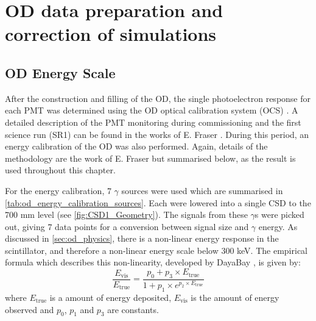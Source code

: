 \section{OD data preparation and correction of simulations}

\subsection{OD Energy Scale} \label{sec:od_energy_scale}
\par
After the construction and filling of the OD, the single photoelectron response for each PMT was determined using the OD optical calibration system (OCS) \cite{lz_ocs_system_ref}.
A detailed description of the PMT monitoring during commissioning and the first science run (SR1) can be found in the works of E. Fraser \cite{ewanfraser_thesis_ref}. 
During this period, an energy calibration of the OD was also performed.
Again, details of the methodology are the work of E. Fraser \cite{ewanfraser_thesis_ref} but summarised below, as the result is used throughout this chapter.
\par
For the energy calibration, 7 $\gamma$ sources were used which are summarised in \autoref{tab:od_energy_calibration_sources}.
Each were lowered into a single CSD to the 700 mm level (see \autoref{fig:CSD1_Geometry}).
The signals from these $\gamma$s were picked out, giving 7 data points for a conversion between signal size and $\gamma$ energy.
As discussed in \autoref{sec:od_physics}, there is a non-linear energy response in the scintillator, and therefore a non-linear energy scale below 300 keV.
The empirical formula which describes this non-linearity, developed by DayaBay \cite{dayabay_antineutrino_oscillation_ref, ls_nonlinear_energy_response_ref}, is given by:
\begin{equation}
    \frac{E_{\text{vis}}}{E_{\text{true}}} = \frac{p_0  + p_3 \times E_{\text{true}}}{1 + p_1 \times e^{p_2 \times E_{\text{true}}}}
    \label{eq:ls_light_response}
\end{equation}
where $E_{\text{true}}$ is a amount of energy deposited, $E_{\text{vis}}$ is the amount of energy observed and $p_0$, $p_1$ and $p_3$ are constants.

